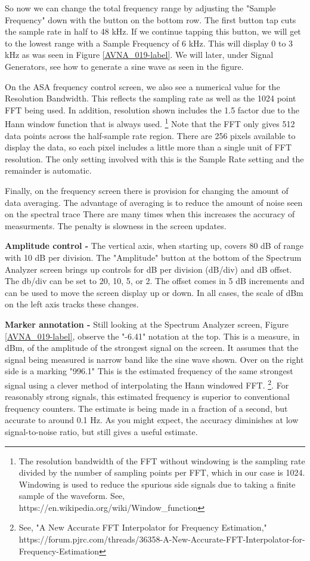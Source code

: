 So now we can change the total frequency range by adjusting the "Sample Frequency" down with the button on the bottom row.  The first button tap cuts the sample rate in half to 48 kHz.  If we continue tapping this button, we will get to the lowest range with a Sample Frequency of 6 kHz.  This will display 0 to 3 kHz as was seen in Figure  \ref{AVNA_019-label}.  We will later, under Signal Generators, see how to generate a sine wave as seen in the figure.


On the ASA frequency control screen,  we also see a numerical value for the Resolution Bandwidth.  This reflects the sampling rate as well as the 1024 point FFT being used.  In addition, resolution shown includes the 1.5 factor due to the Hann window function that is always used.
%
\footnote{The resolution bandwidth of the FFT without windowing is the sampling rate divided by the number of sampling points per FFT, which in our case is 1024.  Windowing is used to reduce the spurious side signals due to taking a finite sample of the waveform.  See, https://en.wikipedia.org/wiki/Window\_function}
%
Note that the FFT only gives 512 data points across the half-sample rate region.  There are 256 pixels available to display the data, so each pixel includes a little more than a single unit of FFT resolution.    The only setting involved with this is the Sample Rate setting and the remainder is automatic.

Finally, on the frequency screen there is provision for changing the amount of data averaging.  The advantage of averaging is to reduce the amount of noise seen on the spectral trace  There are many times when this  increases the accuracy of measurments.  The penalty is slowness in the screen updates.

\textbf{Amplitude control - } The vertical axis, when starting up, covers 80 dB of range with 10 dB per division.  The "Amplitude" button at the bottom of the Spectrum Analyzer screen brings up controls for dB per division (dB/div) and dB offset.  The db/div can be set to 20, 10, 5, or 2.  The offset comes in 5 dB increments and can be used to move the screen display up or down.  In all cases, the scale of dBm on the left axis tracks these changes.

\textbf{Marker annotation - }Still looking at the Spectrum Analyzer screen, Figure  \ref{AVNA_019-label},  observe the "-6.41" notation at the top.  This is a measure, in dBm, of the amplitude of the strongest signal on the screen.  It assumes that the signal being measured is narrow band like the sine wave shown.  Over on the right side is a marking "996.1"  This is the estimated frequency of the same strongest signal using a clever method of interpolating the Hann windowed FFT. 
\footnote{See, "A New Accurate FFT Interpolator for Frequency Estimation,"  https://forum.pjrc.com/threads/36358-A-New-Accurate-FFT-Interpolator-for-Frequency-Estimation}. 
%
For reasonably strong signals, this estimated frequency is superior to conventional frequency counters. The estimate is being made in a fraction of a second, but accurate to around 0.1 Hz.   As you might expect, the accuracy diminishes at low signal-to-noise ratio, but still gives a useful estimate.  

